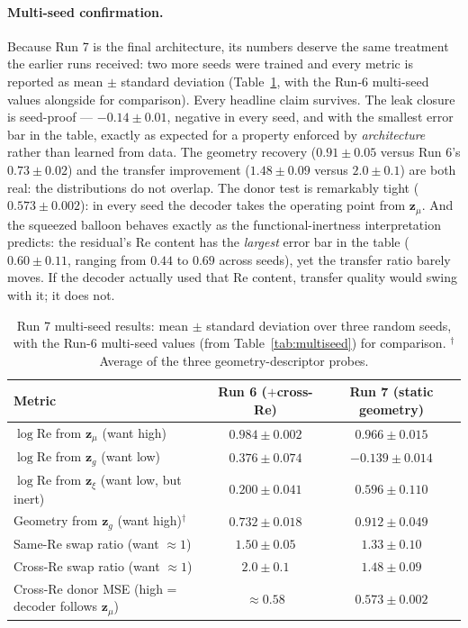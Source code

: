 \documentclass[11pt]{article}
\begin{document}
\paragraph{Multi-seed confirmation.} Because Run 7 is the final
architecture, its numbers deserve the same treatment the earlier runs
received: two more seeds were trained and every metric is reported as
mean $\pm$ standard deviation (Table~\ref{tab:multiseed-run7}, with the
Run-6 multi-seed values alongside for comparison). Every headline claim
survives. The leak closure is seed-proof --- $-0.14 \pm 0.01$, negative
in every seed, and with the smallest error bar in the table, exactly as
expected for a property enforced by \emph{architecture} rather than
learned from data. The geometry recovery ($0.91 \pm 0.05$ versus Run 6's
$0.73 \pm 0.02$) and the transfer improvement ($1.48 \pm 0.09$ versus
$2.0 \pm 0.1$) are both real: the distributions do not overlap. The
donor test is remarkably tight ($0.573 \pm 0.002$): in every seed the
decoder takes the operating point from $\boldsymbol{z}_{\mu}$. And the
squeezed balloon behaves exactly as the functional-inertness
interpretation predicts: the residual's Re content has the
\emph{largest} error bar in the table ($0.60 \pm 0.11$, ranging from
$0.44$ to $0.69$ across seeds), yet the transfer ratio barely moves. If
the decoder actually used that Re content, transfer quality would swing
with it; it does not.

\begin{table}[htbp]
  \centering
  \caption{Run 7 multi-seed results: mean $\pm$ standard deviation over
  three random seeds, with the Run-6 multi-seed values (from
  Table~\ref{tab:multiseed}) for comparison. $^{\dagger}$Average of the
  three geometry-descriptor probes.}
  \label{tab:multiseed-run7}
  \begin{tabular}{lcc}
    \toprule
    Metric & Run 6 ($+$cross-Re) & Run 7 (static geometry) \\
    \midrule
    $\log \mathrm{Re}$ from $\boldsymbol{z}_{\mu}$ (want high)
      & $0.984 \pm 0.002$ & $0.966 \pm 0.015$ \\
    $\log \mathrm{Re}$ from $\boldsymbol{z}_{g}$ (want low)
      & $0.376 \pm 0.074$ & $\mathbf{-0.139 \pm 0.014}$ \\
    $\log \mathrm{Re}$ from $\boldsymbol{z}_{\xi}$ (want low, but inert)
      & $0.200 \pm 0.041$ & $0.596 \pm 0.110$ \\
    Geometry from $\boldsymbol{z}_{g}$ (want high)$^{\dagger}$
      & $0.732 \pm 0.018$ & $\mathbf{0.912 \pm 0.049}$ \\
    Same-Re swap ratio (want $\approx 1$)
      & $1.50 \pm 0.05$ & $1.33 \pm 0.10$ \\
    Cross-Re swap ratio (want $\approx 1$)
      & $2.0 \pm 0.1$ & $\mathbf{1.48 \pm 0.09}$ \\
    Cross-Re donor MSE (high = decoder follows $\boldsymbol{z}_{\mu}$)
      & $\approx 0.58$ & $0.573 \pm 0.002$ \\
    \bottomrule
  \end{tabular}
\end{table}
\end{document}
